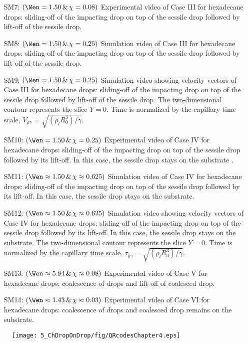 \begin{subappendices}
\begin{enumerate}
		\item[SM7:] $\left(\Wen = 1.50\,\&\,\chi = 0.08\right)$ Experimental video of Case III for hexadecane drops: sliding-off of the impacting drop on top of the sessile drop followed by lift-off of the sessile drop.
		\item[SM8:] $\left(\Wen = 1.50\,\&\,\chi = 0.25\right)$ Simulation video of Case III for hexadecane drops: sliding-off of the impacting drop on top of the sessile drop followed by lift-off of the sessile drop.
		\item[SM9:] $\left(\Wen = 1.50\,\&\,\chi = 0.25\right)$  Simulation video showing velocity vectors of Case III for hexadecane drops: sliding-off of the impacting drop on top of the sessile drop followed by lift-off of the sessile drop. The two-dimensional contour represents the slice $Y = 0$. Time is normalized by the capillary time scale, $V_{\rho\gamma} = \sqrt{\left(\rho_l R_0^3\right)/\gamma}$.
		
		\item[SM10:] $\left(\Wen = 1.50\,\&\,\chi = 0.25\right)$ Experimental video of Case IV for hexadecane drops: sliding-off of the impacting drop on top of the sessile drop followed by its lift-off. In this case, the sessile drop stays on the substrate .
		\item[SM11:] $\left(\Wen \approx 1.50\,\&\,\chi \approx 0.625\right)$ Simulation video of Case IV for hexadecane drops: sliding-off of the impacting drop on top of the sessile drop followed by its lift-off. In this case, the sessile drop stays on the substrate.
		\item[SM12:] $\left(\Wen \approx 1.50\,\&\,\chi \approx 0.625\right)$ Simulation video showing velocity vectors of Case IV for hexadecane drops: sliding-off of the impacting drop on top of the sessile drop followed by its lift-off. In this case, the sessile drop stays on the substrate. The two-dimensional contour represents the slice $Y = 0$. Time is normalized by the capillary time scale, $\tau_{\rho\gamma} = \sqrt{\left(\rho_l R_0^3\right)/\gamma}$.
		
		\item[SM13:] $\left(\Wen \approx 5.84\,\&\,\chi \approx 0.08\right)$ Experimental video of Case V for hexadecane drops: coalescence of drops and lift-off of coalesced drop.
		\item[SM14:] $\left(\Wen \approx 1.43\,\&\,\chi \approx 0.03\right)$ Experimental video of Case VI for hexadecane drops: coalescence of drops and coalesced drop remains on the substrate.
	\end{enumerate}


\begin{figure*}
	\centering
	\texttt{[image: 5\_ChDropOnDrop/fig/QRcodesChapter4.eps]}
\end{figure*}


\end{subappendices}




